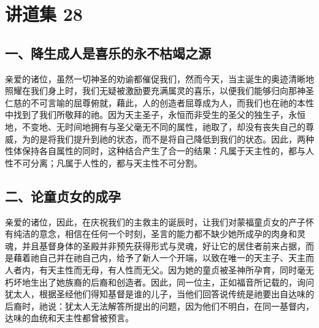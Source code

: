 

\section{讲道集 28}

\par


\subsection{一、降生成人是喜乐的永不枯竭之源}

亲爱的诸位，虽然一切神圣的劝谕都催促我们，然而今天，当主诞生的奥迹清晰地照耀在我们身上时，我们无疑被激励要充满属灵的喜乐，以便我们能够归向那神圣仁慈的不可言喻的屈尊俯就，藉此，人的创造者屈尊成为人，而我们也在祂的本性中找到了我们所敬拜的祂。因为天主圣子，永恒而非受生的圣父的独生子，永恒地，不变地、无时间地拥有与圣父毫无不同的属性，祂取了，却没有丧失自己的尊威，为的是将我们提升到祂的状态，而不是将自己降低到我们的状态。因此，两种性体保持各自属性的同时，这种结合产生了合一的结果：凡属于天主性的，都与人性不可分离；凡属于人性的，都与天主性不可分割。\par


\subsection{二、论童贞女的成孕}

亲爱的诸位，因此，在庆祝我们的主救主的诞辰时，让我们对蒙福童贞女的产子怀有纯洁的意念，相信在任何一个时刻，圣言的能力都不缺少她所成孕的肉身和灵魂，并且基督身体的圣殿并非预先获得形式与灵魂，好让它的居住者前来占据，而是藉着祂自己并在祂自己内，给予了新人一个开端，以致在唯一的天主子、天主而人者内，有天主性而无母，有人性而无父。因为她的童贞被圣神所孕育，同时毫无朽坏地生出了她族裔的后裔和创造者。因此，同一位主，正如福音所记载的，询问犹太人，根据圣经他们得知基督是谁的儿子，当他们回答说传统是祂要出自达味的后裔时，祂说：犹太人无法解答所提出的问题，因为他们不明白，在同一基督内，达味的血统和天主性都曾被预言。\par

